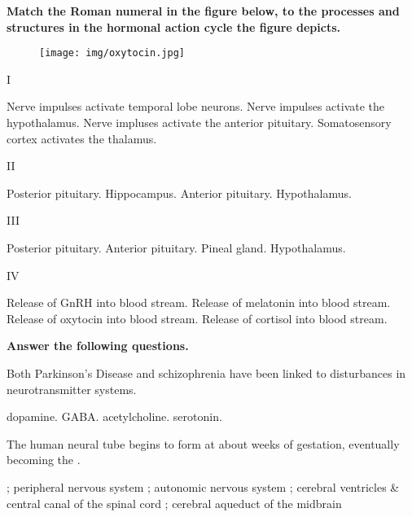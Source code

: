 \documentclass[answers]{exam}
\begin{document}
\begin{questions}
\newpage

\textbf{Match the Roman numeral in the figure below, to the processes and structures in the hormonal action cycle the figure depicts.}

\begin{figure}[h]
\texttt{[image: img/oxytocin.jpg]}
\centering
\end{figure}

\question I
\begin{choices}
\choice Nerve impulses activate temporal lobe neurons.
\correctchoice Nerve impulses activate the hypothalamus.
\choice Nerve impluses activate the anterior pituitary.
\choice Somatosensory cortex activates the thalamus.
\end{choices}

\question II
\begin{choices}
\choice Posterior pituitary.
\choice Hippocampus.
\choice Anterior pituitary.
\correctchoice Hypothalamus.
\end{choices}

\question III
\begin{choices}
\correctchoice Posterior pituitary.
\choice Anterior pituitary.
\choice Pineal gland.
\choice Hypothalamus.
\end{choices}

\question IV
\begin{choices}
\choice Release of GnRH into blood stream.
\choice Release of melatonin into blood stream.
\correctchoice Release of oxytocin into blood stream.
\choice Release of cortisol into blood stream.
\end{choices}

\newpage

\textbf{Answer the following questions.}

\question Both Parkinson's Disease and schizophrenia have been linked to disturbances in \fillin neurotransmitter systems.
\begin{choices}
\correctchoice  dopamine.
\choice  GABA.
\choice  acetylcholine.
\choice  serotonin.
\end{choices}


\question The human neural tube begins to form at about \fillin weeks of gestation, eventually becoming the \fillin. 
\begin{choices}
; peripheral nervous system
; autonomic nervous system
; cerebral ventricles \& central canal of the spinal cord
; cerebral aqueduct of the midbrain
\end{choices}


\end{questions}
\end{document}
